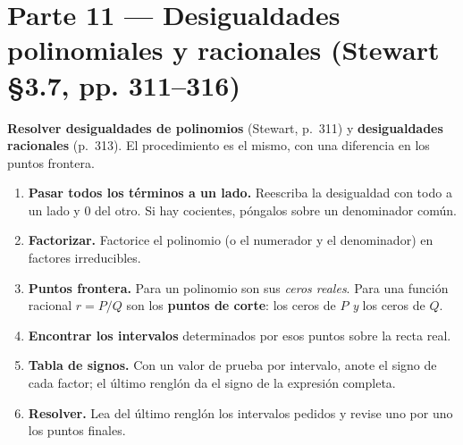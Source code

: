 \documentclass[11pt]{article}
\begin{document}
\section*{Parte 11 — Desigualdades polinomiales y racionales (Stewart §3.7, pp. 311--316)}

\begin{teo}
\textbf{Resolver desigualdades de polinomios} (Stewart, p.~311) y \textbf{desigualdades racionales} (p.~313). El procedimiento es el mismo, con una diferencia en los puntos frontera.

\begin{enumerate}[leftmargin=*]
\item \textbf{Pasar todos los términos a un lado.} Reescriba la desigualdad con todo a un lado y $0$ del otro. Si hay cocientes, póngalos sobre un denominador común.
\item \textbf{Factorizar.} Factorice el polinomio (o el numerador y el denominador) en factores irreducibles.
\item \textbf{Puntos frontera.} Para un polinomio son sus \emph{ceros reales}. Para una función racional $r=P/Q$ son los \textbf{puntos de corte}: los ceros de $P$ \emph{y} los ceros de $Q$.
\item \textbf{Encontrar los intervalos} determinados por esos puntos sobre la recta real.
\item \textbf{Tabla de signos.} Con un valor de prueba por intervalo, anote el signo de cada factor; el último renglón da el signo de la expresión completa.
\item \textbf{Resolver.} Lea del último renglón los intervalos pedidos y revise uno por uno los puntos finales.
\end{enumerate}
\end{teo}
\end{document}
